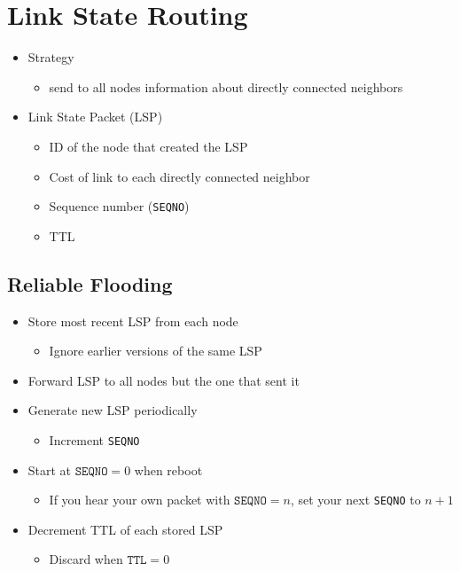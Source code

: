\section{Link State Routing}
\begin{itemize}[nosep]
    \item Strategy
          \begin{itemize}[nosep]
              \item send to all nodes information about directly connected neighbors
          \end{itemize}
    \item Link State Packet (LSP)
          \begin{itemize}[nosep]
              \item ID of the node that created the LSP
              \item Cost of link to each directly connected neighbor
              \item Sequence number (\texttt{SEQNO})
              \item TTL
          \end{itemize}
\end{itemize}

\subsection{Reliable Flooding}
\begin{itemize}[nosep]
    \item Store most recent LSP from each node
          \begin{itemize}[nosep]
              \item Ignore earlier versions of the same LSP
          \end{itemize}
    \item Forward LSP to all nodes but the one that sent it
    \item Generate new LSP periodically
          \begin{itemize}[nosep]
              \item Increment \texttt{SEQNO}
          \end{itemize}
    \item Start at $\texttt{SEQNO}=0$ when reboot
          \begin{itemize}[nosep]
              \item If you hear your own packet with $\texttt{SEQNO} = n$, set your next \texttt{SEQNO} to $n + 1$
          \end{itemize}
    \item Decrement TTL of each stored LSP
          \begin{itemize}[nosep]
              \item Discard when $\texttt{TTL} = 0$
          \end{itemize}
\end{itemize}
